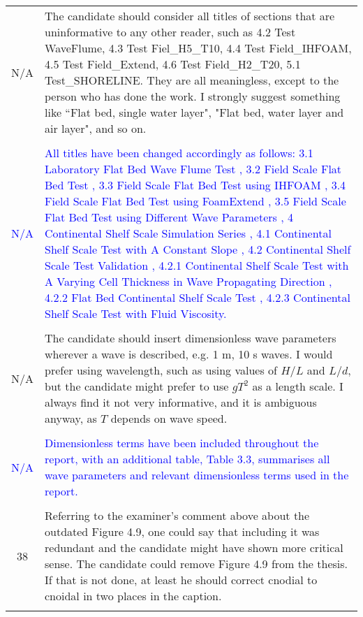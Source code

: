 \documentclass[12pt]{article}
\begin{document}
\begin{center}
\begin{tabularx}{\linewidth}{ c | X }
    N/A & The candidate should consider all titles of sections that are uninformative to any other reader, such as 4.2 Test WaveFlume, 4.3 Test Fiel\_H5\_T10, 4.4 Test Field\_IHFOAM, 4.5 Test Field\_Extend, 4.6
    Test Field\_H2\_T20, 5.1 Test\_SHORELINE. They are all meaningless, except to the person who has
    done the work. I strongly suggest something like “Flat bed, single water layer", "Flat bed, water
    layer and air layer", and so on.   \\
    & \\
     \textcolor{blue}{N/A} & \textcolor{blue}{All titles have been changed accordingly as follows:
    3.1 Laboratory Flat Bed Wave Flume Test , 
    3.2 Field Scale Flat Bed Test ,
    3.3 Field Scale Flat Bed Test using IHFOAM ,
    3.4 Field Scale Flat Bed Test using FoamExtend ,
    3.5 Field Scale Flat Bed Test using Different Wave Parameters , 
    4 Continental Shelf Scale Simulation Series ,
    4.1 Continental Shelf Scale Test with A Constant Slope , 
    4.2 Continental Shelf Scale Test Validation  ,
    4.2.1
    Continental Shelf Scale Test with A Varying Cell Thickness in Wave Propagating
    Direction ,
    4.2.2 Flat Bed Continental Shelf Scale Test ,
    4.2.3 Continental Shelf Scale Test with Fluid Viscosity.} \\
    & \\   
    \hline    
      N/A & The candidate should insert dimensionless wave parameters wherever a wave is described, e.g. 1
    m, 10 s waves. I would prefer using wavelength, such as using values of $H/L$ and $L/d$, but the
    candidate might prefer to use $gT^2$ as a length scale. I always find it not very informative, and it is
    ambiguous anyway, as $T$ depends on wave speed.  \\
    & \\
    \textcolor{blue}{N/A} & \textcolor{blue}{Dimensionless terms have been included throughout the report, with an additional table, Table 3.3, summarises all wave parameters and relevant dimensionless terms used in the report.}\\ 
    & \\
    \hline
     38 & Referring to the examiner’s comment above about the outdated Figure 4.9, one could say that
    including it was redundant and the candidate might have shown more critical sense.
    The candidate could remove Figure 4.9 from the thesis. If that is not done, at least he should correct
    cnodial to cnoidal in two places in the caption.\\
     & \\

\end{tabularx}
\end{center}
\end{document}
